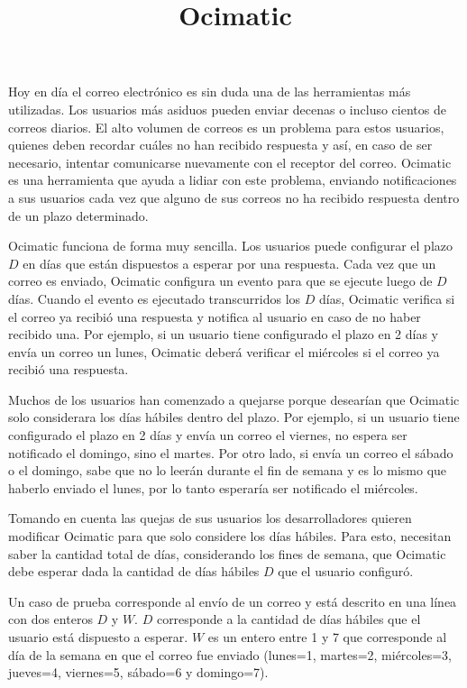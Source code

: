 \documentclass{oci}
\title{Ocimatic}
\begin{document}
\begin{problemDescription}
  Hoy en día el correo electrónico es sin duda una de las herramientas más
  utilizadas.
  Los usuarios más asiduos pueden enviar decenas o incluso cientos de correos
  diarios.
  El alto volumen de correos es un problema para estos usuarios, quienes deben
  recordar cuáles no han recibido respuesta y así, en caso de ser necesario,
  intentar comunicarse nuevamente con el receptor del correo.
  Ocimatic es una herramienta que ayuda a lidiar con este problema, enviando
  notificaciones a sus usuarios cada vez que alguno de sus correos no ha
  recibido respuesta dentro de un plazo determinado.
  
  Ocimatic funciona de forma muy sencilla.
  Los usuarios puede configurar el plazo $D$ en días que están dispuestos a
  esperar por una respuesta.
  Cada vez que un correo es enviado, Ocimatic configura un evento para que se
  ejecute luego de $D$ días.
  Cuando el evento es ejecutado transcurridos los $D$ días, Ocimatic verifica
  si el correo ya recibió una respuesta y notifica al usuario en caso de no
  haber recibido una.
  Por ejemplo, si un usuario tiene configurado el plazo en 2 días y envía un
  correo un lunes, Ocimatic deberá verificar el miércoles si el correo ya recibió
  una respuesta.

  Muchos de los usuarios han comenzado a quejarse porque desearían que Ocimatic
  solo considerara los días hábiles dentro del plazo.
  Por ejemplo, si un usuario tiene configurado el plazo en 2 días y envía un
  correo el viernes, no espera ser notificado el domingo, sino el martes.
  Por otro lado, si envía un correo el sábado o el domingo, sabe que no lo
  leerán durante el fin de semana y es lo mismo que haberlo enviado el lunes,
  por lo tanto esperaría ser notificado el miércoles.

  Tomando en cuenta las quejas de sus usuarios los desarrolladores quieren
  modificar Ocimatic para que solo considere los días hábiles.
  Para esto, necesitan saber la cantidad total de días, considerando los fines
  de semana, que Ocimatic debe esperar dada la cantidad de días hábiles $D$ que
  el usuario configuró.
\end{problemDescription}

\begin{inputDescription}
  Un caso de prueba corresponde al envío de un correo y está descrito en una
  línea con dos enteros $D$ y $W$.
  $D$ corresponde a la cantidad de días hábiles que el usuario está dispuesto a
  esperar.
  $W$ es un entero entre 1 y 7 que corresponde al día de la semana en que el
  correo fue enviado (lunes=1, martes=2, miércoles=3, jueves=4, viernes=5,
  sábado=6 y domingo=7).
\end{inputDescription}
\end{document}
